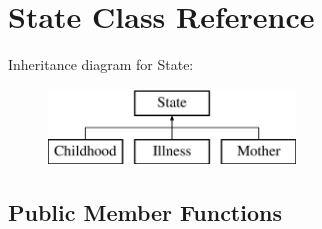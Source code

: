 \hypertarget{class_state}{}\section{State Class Reference}
\label{class_state}
Inheritance diagram for State\+:\begin{figure}[H]
\begin{center}
\leavevmode
\includegraphics[height=2.000000cm]{class_state}
\end{center}
\end{figure}
\subsection*{Public Member Functions}
